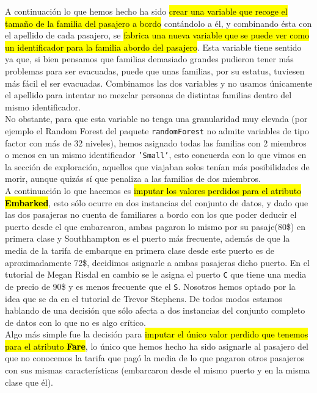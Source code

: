 \documentclass[10pt,a4paper]{article}
\newcommand{\emp}[1]{\sethlcolor{light-yellow}\hl{#1}} %
\newcommand{\code}[1]{\textcolor{rblue}{\texttt{#1}}} %
\begin{document}
A continuación lo que hemos hecho ha sido \emp{crear una variable que recoge el tamaño de la familia del pasajero a bordo} contándolo a él, y combinando ésta con el apellido de cada pasajero, se \emp{fabrica una nueva variable que se puede ver como un identificador para la familia abordo del pasajero}. Esta variable tiene sentido ya que, si bien pensamos que familias demasiado grandes pudieron tener más problemas para ser evacuadas, puede que unas familias, por su estatus, tuviesen más fácil el ser evacuadas. Combinamos las dos variables y no usamos únicamente el apellido para intentar no mezclar personas de distintas familias dentro del mismo identificador.\\

No obstante, para que esta variable no tenga una granularidad muy elevada (por ejemplo el Random Forest del paquete \code{randomForest} no admite variables de tipo factor con más de 32 niveles), hemos asignado todas las familias con 2 miembros o menos en un mismo identificador \code{'Small'}, esto concuerda con lo que vimos en la sección de exploración, aquellos que viajaban solos tenían más posibilidades de morir, aunque quizás sí que penaliza a las familias de dos miembros.\\

A continuación lo que hacemos es \emp{imputar los valores perdidos para el atributo \textbf{Embarked}}, esto sólo ocurre en dos instancias del conjunto de datos, y dado que las dos pasajeras no cuenta de familiares a bordo con los que poder deducir el puerto desde el que embarcaron, ambas pagaron lo mismo por su pasaje(80\$) en primera clase y Southhampton es el puerto más frecuente, además de que la media de la tarifa de embarque en primera clase desde este puerto es de aproximadamente 72\$, decidimos asignarle a ambas pasajeras dicho puerto. En el tutorial de Megan Risdal en cambio se le asigna el puerto \code{C} que tiene una media de precio de 90\$ y es menos frecuente que el \code{S}. Nosotros hemos optado por la idea que se da en el tutorial de Trevor Stephens. De todos modos estamos hablando de una decisión que sólo afecta a dos instancias del conjunto completo de datos con lo que no es algo crítico.\\

Algo más simple fue la decisión para \emp{imputar el único valor perdido que tenemos para el atributo \textbf{Fare}}, lo único que hemos hecho ha sido asignarle al pasajero del que no conocemos la tarifa que pagó la media de lo que pagaron otros pasajeros con sus mismas características (embarcaron desde el mismo puerto y en la misma clase que él).\\
\end{document}
